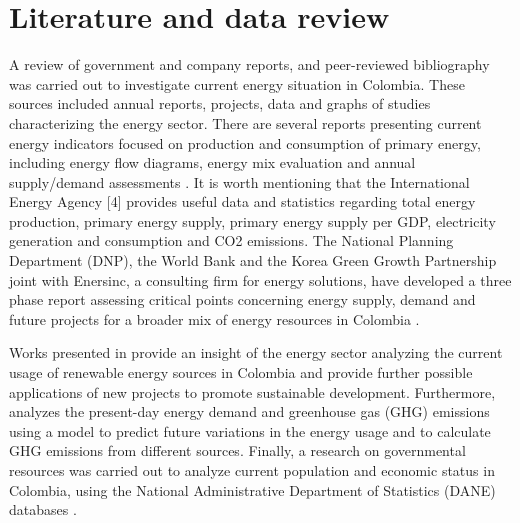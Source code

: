\documentclass[svn, final]{rureport}
\begin{document}

\section{Literature and data review}

A review of government and company reports, and peer-reviewed bibliography was carried out to investigate current energy situation in Colombia. These sources included annual reports, projects, data and graphs of studies characterizing the energy sector. There are several reports presenting current energy indicators focused on production and consumption of primary energy, including energy flow diagrams, energy mix evaluation and annual supply/demand assessments \cite{UPME_plan2019, UPME_balance_2018, iadb_3_2015}. It is worth mentioning that the International Energy Agency [4] provides useful data and statistics regarding total energy production, primary energy supply, primary energy supply per GDP, electricity generation and consumption and CO2 emissions. The National Planning Department (DNP), the World Bank and the Korea Green Growth Partnership joint with Enersinc, a consulting firm for energy solutions, have developed a three phase report assessing critical points concerning energy supply, demand and future projects for a broader mix of energy resources in Colombia \cite{dnp_energy_supply_2017-1, dnp_energy_demand_2017-2, dnp_green_growth_2018}.

Works presented in \cite{forero2019analysis, lopez2020solar, obregon2019study, rodriguez2018photovoltaic} provide an insight of the energy sector analyzing the current usage of renewable energy sources in Colombia and provide further possible applications of new projects to promote sustainable development. Furthermore, \cite{nieves2019energy} analyzes the present-day energy demand and greenhouse gas (GHG) emissions using a model to predict future variations in the energy usage and to calculate GHG emissions from different sources. Finally, a research on governmental resources was carried out to analyze current population and economic status in Colombia, using the National Administrative Department of Statistics (DANE) databases \cite{dane_population_2020, dane_gdp_2020}.

\end{document}
